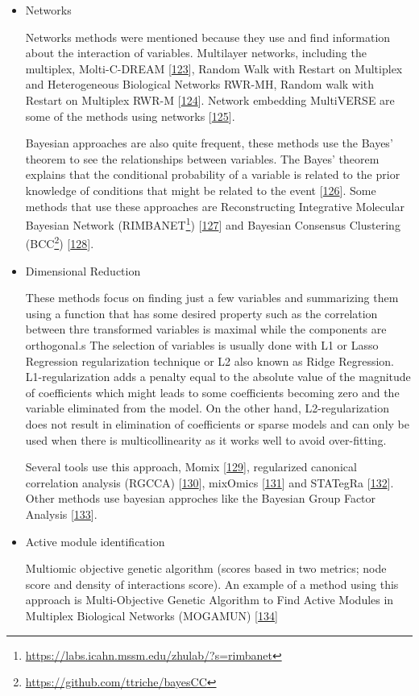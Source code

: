 \documentclass[
  a4paper,
]{book}
\DeclareRobustCommand{\href}[2]{#2\footnote{\url{#1}}}
\begin{document}
\begin{itemize}
\item
  Networks

  Networks methods were mentioned because they use and find information about the interaction of variables.
  Multilayer networks, including the multiplex, Molti-C-DREAM {[}\protect\hyperlink{ref-didier2018}{123}{]}, Random Walk with Restart on Multiplex and Heterogeneous Biological Networks RWR-MH, Random walk with Restart on Multiplex RWR-M {[}\protect\hyperlink{ref-valdeolivas2019}{124}{]}.
  Network embedding MultiVERSE are some of the methods using networks {[}\protect\hyperlink{ref-pio-lopez2021}{125}{]}.

  Bayesian approaches are also quite frequent, these methods use the Bayes' theorem to see the relationships between variables.
  The Bayes' theorem explains that the conditional probability of a variable is related to the prior knowledge of conditions that might be related to the event {[}\protect\hyperlink{ref-bayes1763}{126}{]}.
  Some methods that use these approaches are Reconstructing Integrative Molecular Bayesian Network (\href{https://labs.icahn.mssm.edu/zhulab/?s=rimbanet}{RIMBANET}) {[}\protect\hyperlink{ref-zhu2012}{127}{]} and Bayesian Consensus Clustering (\href{https://github.com/ttriche/bayesCC}{BCC}) {[}\protect\hyperlink{ref-lock2013}{128}{]}.
\item
  Dimensional Reduction

  These methods focus on finding just a few variables and summarizing them using a function that has some desired property such as the correlation between thre transformed variables is maximal while the components are orthogonal.s The selection of variables is usually done with L1 or Lasso Regression regularization technique or L2 also known as Ridge Regression.
  L1-regularization adds a penalty equal to the absolute value of the magnitude of coefficients which might leads to some coefficients becoming zero and the variable eliminated from the model.
  On the other hand, L2-regularization does not result in elimination of coefficients or sparse models and can only be used when there is multicollinearity as it works well to avoid over-fitting.

  Several tools use this approach, Momix {[}\protect\hyperlink{ref-cantini_benchmarking_2020}{129}{]}, regularized canonical correlation analysis (RGCCA) {[}\protect\hyperlink{ref-tenenhaus2017}{130}{]}, mixOmics {[}\protect\hyperlink{ref-rohart2017}{131}{]} and STATegRa {[}\protect\hyperlink{ref-gomez-cabrero2019}{132}{]}.
  Other methods use bayesian approches like the Bayesian Group Factor Analysis {[}\protect\hyperlink{ref-virtanen2012}{133}{]}.
\item
  Active module identification

  Multiomic objective genetic algorithm (scores based in two metrics; node score and density of interactions score).
  An example of a method using this approach is Multi-Objective Genetic Algorithm to Find Active Modules in Multiplex Biological Networks (MOGAMUN) {[}\protect\hyperlink{ref-novoa-del-toro2020}{134}{]}
\end{itemize}
\end{document}
